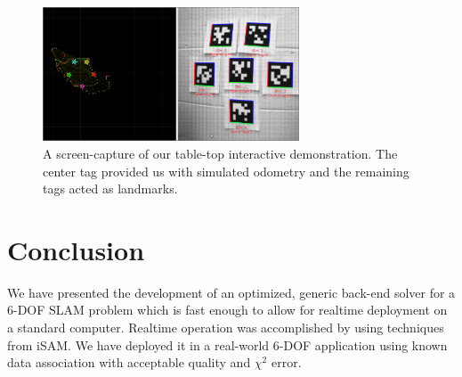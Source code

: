 \documentclass[conference]{IEEEtran}
\begin{document}
\begin{figure}[h]
  \centering
  \includegraphics[width=3.0in]{images/interactiveDemo}
  \caption{A screen-capture of our table-top interactive
    demonstration.  The center tag provided us with simulated odometry
  and the remaining tags acted as landmarks.}
  \label{fig:interactiveDemo}
\end{figure}

\section{Conclusion}
\label{sec:conclusion}

We have presented the development of an optimized, generic back-end solver for a 6-\ac{DOF}
\ac{SLAM} problem which is fast enough to allow for realtime deployment on a standard
computer.  Realtime operation was accomplished by using techniques from iSAM. We have 
deployed it in a real-world 6-\ac{DOF} application using known data
association with acceptable quality and $\chi^2$ error.




\end{document}
